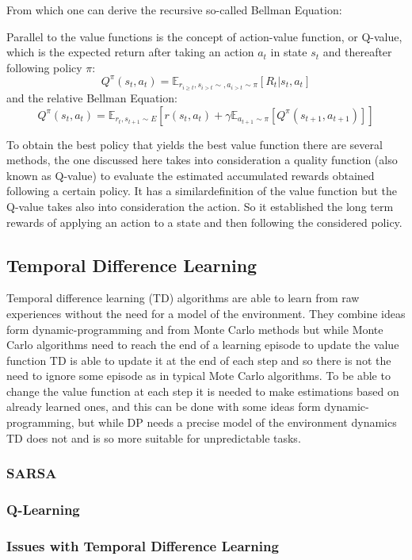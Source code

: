 From which one can derive the recursive so-called Bellman Equation:

Parallel to the value functions is the concept of action-value function, or Q-value, which is the expected return after taking an action \(a_t\) in state \(s_t\) and thereafter following policy \(\pi\):
\[Q^\pi(s_t,a_t)=\mathbb{E}_{r_{i \geq t},s_{i>t} \sim ,a_{i>t} \sim \pi}[R_t|s_t,a_t]\]
and the relative Bellman Equation:
\[Q^\pi(s_t,a_t)=\mathbb{E}_{r_t,s_{t+1} \sim E }\left[ r(s_t,a_t) + \gamma \mathbb{E}_{a_{t+1} \sim \pi}\left[Q^\pi (s_{t+1},a_{t+1})\right]\right]\]

To obtain the best policy that yields the best value function there are several methods, the one discussed here takes into consideration a quality function (also known as Q-value) to
evaluate the estimated accumulated rewards obtained following a certain policy. It has a similardefinition of the value function but the Q-value takes also into consideration the action. So
it established the long term rewards of applying an action to a state and then following the considered policy. 

\subsection{Temporal Difference Learning}
Temporal difference learning (TD) \cite{ilr} algorithms are able to learn from raw experiences without the need for a model of the environment. They combine ideas form dynamic-programming and from Monte Carlo methods but while Monte Carlo algorithms need to reach the end of a learning episode to update the value function TD is able to update it at the end of each step and so there is not the need to ignore some episode as in typical Mote Carlo algorithms.
To be able to change the value function at each step it is needed to make estimations based on already learned ones, and this can be done with some ideas form dynamic-programming, but while DP needs a precise model of the environment dynamics TD does not and is so more suitable for unpredictable tasks.
\subsubsection{SARSA}

\subsubsection{Q-Learning}
\subsubsection{Issues with Temporal Difference Learning}
